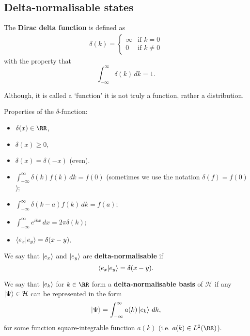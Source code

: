 \documentclass[12pt, a4paper]{article}
\begin{document}
\subsection{Delta-normalisable states}

\begin{definition}
    The \textbf{Dirac delta function} is defined as 
    \[\begin{aligned}
        \delta(k) = \begin{cases}
            \infty &\text{if } k=0 \\
            0 &\text{if } k\neq 0
        \end{cases}
    \end{aligned}\]
    with the property that 
    \[\int_{-\infty}^{\infty} \delta(k) \, dk =1.\]
\end{definition}

\begin{mdremark}
    Although, it is called a `function' it is not truly a function, rather a distribution. 
\end{mdremark}

\begin{mdthm}
    Properties of the \(\delta\)-function:
    \begin{itemize}
        \item \(\delta(x) \in \RR\),
        \item \(\delta(x) \geq 0\),
        \item \(\delta(x)=\delta(-x)\) (even).
        \item \(\int_{-\infty}^{\infty} \delta(k) f(k) \, dk = f(0)\) (sometimes we use the notation \(\delta(f)= f(0)\));
        \item \(\int_{-\infty}^{\infty} \delta(k-a)f(k) \, dk = f(a)\);
        \item \(\int_{-\infty}^{\infty} e^{ikx} \, dx = 2\pi \delta(k)\);
        \item \(\bra{e_x}\ket{e_y}=\delta(x-y)\).
    \end{itemize}
\end{mdthm}

\begin{definition}
    We say that \(\ket{e_x}\) and \(\ket{e_y}\) are \textbf{delta-normalisable} if 
    \[\bra{e_x}\ket{e_y}=\delta(x-y).\]
\end{definition}

\begin{definition}
    We say that \(\ket{e_k}\) for \(k \in \RR\) form a \textbf{delta-normalisable basis} of \(\mathcal{H}\) if any \(\ket{\Psi} \in \mathcal{H}\) can be represented in the form
    \[\ket{\Psi} = \int_{-\infty}^{\infty} a(k) \ket{e_k} \, dk,\]
    for some function square-integrable function \(a(k)\) (i.e. \(a(k) \in L^2(\RR)\)).
\end{definition}
\end{document}
